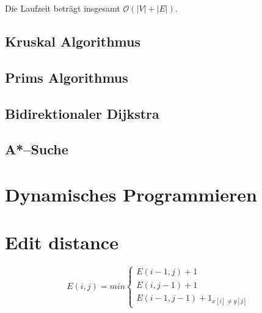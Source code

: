 \documentclass[10pt,a4paper,oneside,ngerman,numbers=noenddot]{scrartcl}
\begin{document}
		Die Laufzeit beträgt insgesamt $\mathcal{O}(|V| + |E|)$.
		
	\subsection{Kruskal Algorithmus}
	
		
	\subsection{Prims Algorithmus}
	
		
	\subsection{Bidirektionaler Dijkstra}
	
	
	\subsection{A*--Suche}
	
		
\section{Dynamisches Programmieren}

	
\section{Edit distance}

	
	\[
		E(i, j) = min\begin{cases}
			E(i - 1, j) + 1 \\
			E(i, j - 1) + 1 \\
			E(i - 1, j - 1) + \mathrm{1}_{x[i] \neq y[j]}
		\end{cases}
	\]
\end{document}
